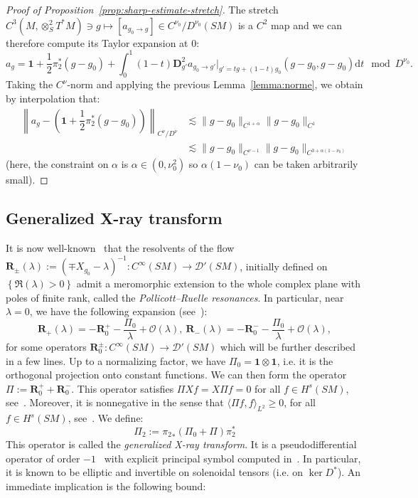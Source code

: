 \documentclass[10pt]{amsart}
\theoremstyle{definition}\newtheorem{defi}[theo]{Definition}\newtheorem{rema}[theo]{Remark}\newtheorem{exam}[theo]{Example}\newtheorem{exem}[theo]{Example}\newtheorem{nota}[theo]{Notation}
\newcommand{\RR}{\mathbf{R}}
\newcommand{\bdD}{\mathbf{D}}
\newcommand{\bfun}{\mathbf{1}}
\newcommand{\mc}{\mathcal}
\newcommand{\dd}{\mathrm{d}}
\begin{document}
\begin{proof}[Proof of Proposition~\ref{prop:sharp-estimate-stretch}]
The stretch $C^3(M,\otimes^2_S T^*M) \ni g \mapsto [a_{g_0 \to g}] \in C^{\nu_0}/D^{\nu_0}(SM)$ is a $C^2$ map and we can therefore compute its Taylor expansion at $0$:
\[
a_g = \bfun + \dfrac{1}{2} \pi_2^*(g-g_0) + \int_0^1 (1-t) \bdD^2_{g'} a_{g_0 \to g'}|_{g'=tg + (1-t)g_0} (g-g_0,g-g_0) \dd t \mod D^{\nu_0}.
\]
Taking the $C^{\nu}$-norm and applying the previous Lemma~\ref{lemma:norme}, we obtain by interpolation that:
\begin{align*}
\left\|a_g - \left(\bfun + \dfrac{1}{2} \pi_2^*(g-g_0)\right)\right\|_{C^{\nu}/D^{\nu}} &\lesssim \|g-g_0\|_{C^{1+\alpha}}\|g-g_0\|_{C^{1}}\\
& \lesssim \|g-g_0\|_{C^{\nu-1}} \|g-g_0\|_{C^{3+\alpha(1-\nu_0)}}
\end{align*}
(here, the constraint on $\alpha$ is $\alpha \in (0,\nu_0^2)$ so $\alpha(1-\nu_0)$ can be taken arbitrarily small).
\end{proof}



\subsection{Generalized X-ray transform}

It is now well-known~\cite{Dyatlov-Zworski-16,Faure-Sjostrand-11,Faure-Tsuji-13,Giulietti-Liverani-Pollicott-13} that the resolvents of the flow $\RR_{\pm}(\lambda) := (\mp X_{g_0}-\lambda)^{-1} : C^\infty(SM) \rightarrow \mc{D}'(SM)$, initially defined on $\left\{\Re(\lambda) > 0 \right\}$ admit a meromorphic extension to the whole complex plane with poles of finite rank, called the \emph{Pollicott--Ruelle resonances}. In particular, near $\lambda = 0$, we have the following expansion (see~\cite[Section~2.3]{Guillarmou-17-1}):
\[
\RR_+(\lambda) = -\RR_0^+ - \dfrac{\Pi_0}{\lambda} + \mc{O}(\lambda),\ \RR_-(\lambda) = -\RR_0^- - \dfrac{\Pi_0}{\lambda} + \mc{O}(\lambda),
\]
for some operators $\RR_0^{\pm} : C^\infty(SM) \rightarrow \mc{D}'(SM)$ which will be further described in a few lines. Up to a normalizing factor, we have $\Pi_0 = \bfun \otimes \bfun$, i.e. it is the orthogonal projection onto constant functions. We can then form the operator $\Pi := \RR_0^+ + \RR_0^-$. This operator satisfies $\Pi X f= X \Pi f= 0$ for all $f \in H^s(SM)$, see~\cite[Theorem~2.6]{Guillarmou-17-1}. Moreover, it is nonnegative in the sense that $\langle \Pi f, f \rangle_{L^2} \geq 0$, for all $f \in H^s(SM)$, see~\cite[Lemma~4.3]{Gouezel-Lefeuvre-19}. We define:
\[
\Pi_2 := {\pi_2}_*(\Pi_0 + \Pi) \pi_2^*
\]
This operator is called the \emph{generalized X-ray transform}. It is a pseudodifferential operator of order $-1$~\cite[Theorem~3.1]{Guillarmou-17-1} with explicit principal symbol computed in~\cite[Theorem~4.4]{Gouezel-Lefeuvre-19}. In particular, it is known to be elliptic and invertible on solenoidal tensors (i.e. on $\ker D^*$). An immediate implication is the following bound:
\end{document}
